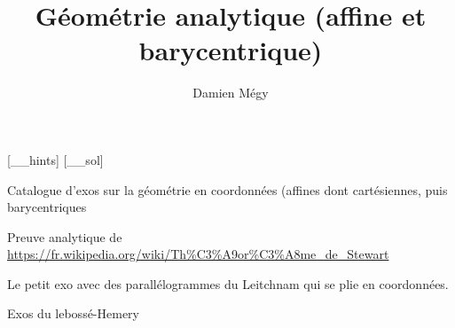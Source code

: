 





[_\jobname_hints]
[_\jobname_sol]


\title{Géométrie analytique (affine et barycentrique)}
\author{Damien Mégy}
\maketitle

\avertissement 


Catalogue d'exos sur la géométrie en coordonnées (affines dont cartésiennes, puis barycentriques


\begin{exo}
Preuve analytique de \url{https://fr.wikipedia.org/wiki/Th%C3%A9or%C3%A8me_de_Stewart}
\begin{hint}
\end{hint}
\begin{sol}
\end{sol}
\end{exo}

\begin{exo}
Le petit exo avec des parallélogrammes du Leitchnam qui se plie en coordonnées.
\begin{hint}
\end{hint}
\begin{sol}
\end{sol}
\end{exo}

\begin{exo}
Exos du lebossé-Hemery
\begin{hint}
\end{hint}
\begin{sol}
\end{sol}
\end{exo}

\begin{exo}
\begin{hint}
\end{hint}
\begin{sol}
\end{sol}
\end{exo}

\begin{exo}
\begin{hint}
\end{hint}
\begin{sol}
\end{sol}
\end{exo}



\indications
\correction




